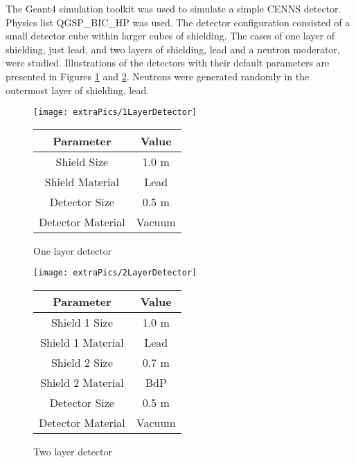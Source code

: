 \documentclass[12pt]{article}
\begin{document}
The Geant4 simulation toolkit was used to simulate a simple CENNS detector. Physics list QGSP\_BIC\_HP was used. The detector configuration consisted of a small detector cube within larger cubes of shielding. The cases of one layer of shielding, just lead, and two layers of shielding, lead and a neutron moderator, were studied. Illustrations of the detectors with their default parameters are presented in Figures \ref{fig:det1} and \ref{fig:det2}. Neutrons were generated randomly in the outermost layer of shielding, lead.
\begin{figure}[H]
  \caption{One layer detector}
  \label{fig:det1}
  \centering
  \begin{minipage}[t]{0.45\linewidth}
    \centering
    \vspace{0pt}
    \texttt{[image: extraPics/1LayerDetector]}
  \end{minipage}
  \quad
  \begin{minipage}[t]{0.45\linewidth}
    \centering
    \vspace{0pt}
    \begin{tabular}{c c}
      \hline\hline
      Parameter         & Value  \\
      \hline
      Shield Size       & 1.0 m  \\
      Shield Material   & Lead   \\
      Detector Size     & 0.5 m  \\
      Detector Material & Vacuum \\
      \hline
    \end{tabular}
  \end{minipage}
\end{figure}

\begin{figure}[H]
  \centering
  \caption{Two layer detector}
  \label{fig:det2}
  \begin{minipage}[t]{0.45\linewidth}
    \centering
    \vspace{0pt}
    \texttt{[image: extraPics/2LayerDetector]}
  \end{minipage}
  \quad
  \begin{minipage}[t]{0.45\linewidth}
    \centering
    \vspace{0pt}
    \begin{tabular}{c c}
      \hline\hline
      Parameter         & Value  \\
      \hline
      Shield 1 Size     & 1.0 m  \\
      Shield 1 Material & Lead   \\
      Shield 2 Size     & 0.7 m  \\
      Shield 2 Material & BdP    \\
      Detector Size     & 0.5 m  \\
      Detector Material & Vacuum \\
      \hline
    \end{tabular}
  \end{minipage}
\end{figure}
\end{document}
